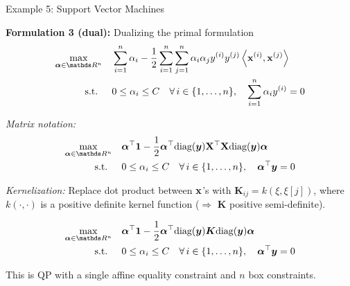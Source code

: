 \documentclass[11pt,compress,t,notes=noshow, xcolor=table]{beamer}
\begin{document}
\begin{frame2}{Example 5: Support Vector Machines}
\begin{footnotesize}
\textbf{Formulation 3 (dual): } Dualizing the primal formulation
$$
\begin{aligned}
\max\limits_{\bm{\alpha} \in \R^n} \quad & \sum_{i=1}^n \alpha_i - \frac{1}{2}\sum_{i=1}^n\sum_{j=1}^n\alpha_i\alpha_j\yi y^{(j)} \scp{\xi}{\xv^{(j)}} \\
\text{s.t. } \quad & 0 \le \alpha_i \le C \quad \forall\, i \in \nset, \quad \sum_{i=1}^n \alpha_i \yi = 0
\end{aligned}
$$
\end{footnotesize}

\spacer

\begin{footnotesize}
\textit{Matrix notation:}
$$
\begin{aligned}
\max\limits_{\bm{\alpha} \in \R^n} \quad & \bm{\alpha}^\top \bm{1} - \frac{1}{2} \bm{\alpha}^\top \text{diag}(\bm{y}) \Xmat^\top \Xmat \text{diag}(\bm{y})\bm{\alpha} \\
\text{s.t. } \quad & 0 \le \alpha_i \le C \quad \forall\, i \in \nset, \quad \bm{\alpha}^\top \bm{y} = 0
\end{aligned}
$$

\textit{Kernelization:}
Replace dot product between $\mathbf{x}$'s with $\bm{K}_{ij} = k(\xi, \xi[j])$, where $k(\cdot,\cdot)$ is a positive definite kernel function ($\Rightarrow$ $\bm{K}$ positive semi-definite).
\end{footnotesize}

\spacer

\begin{footnotesize}
$$
\begin{aligned}
\max\limits_{\bm{\alpha} \in \R^n} \quad & \bm{\alpha}^\top \bm{1} - \frac{1}{2} \bm{\alpha}^\top \text{diag}(\bm{y}) \bm{K} \text{diag}(\bm{y})\bm{\alpha} \\
\text{s.t. } \quad & 0 \le \alpha_i \le C \quad \forall\, i \in \nset, \quad \bm{\alpha}^\top \bm{y} = 0
\end{aligned}
$$

\spacer

This is QP with a single affine equality constraint and $n$ box constraints.
\end{footnotesize}
\end{frame2}
\end{document}
